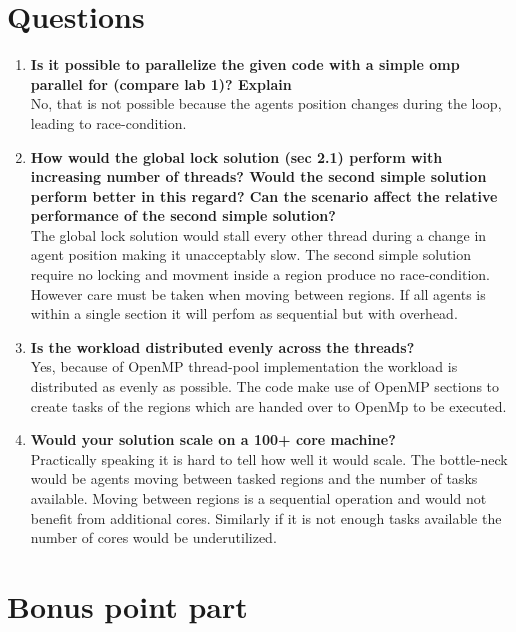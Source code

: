 \documentclass[a4paper,11pt]{article}
\begin{document}
\section{Questions}
\begin{enumerate}[label=\Alph*.]
\item \textbf{Is it possible to parallelize the given code with a
  simple omp parallel for (compare lab 1)? Explain}\\ No, that is not possible
  because the agents position changes during the loop, leading to
  race-condition.
\item \textbf{How would the global lock solution (sec 2.1) perform
  with increasing number of threads? Would the second simple solution
  perform better in this regard? Can the scenario affect the relative
  performance of the second simple solution?}\\ The global lock
  solution would stall every other thread during a change in agent
  position making it unacceptably slow. The second simple solution
  require no locking and movment inside a region produce no
  race-condition. However care must be taken when moving between
  regions. If all agents is within a single section it will perfom as
  sequential but with overhead.
\item \textbf{Is the workload distributed evenly across the
  threads?}\\ Yes, because of OpenMP thread-pool implementation the
  workload is distributed as evenly as possible. The code make use of
  OpenMP sections to create tasks of the regions which are handed over
  to OpenMp to be executed.
\item \textbf{Would your solution scale on a 100+ core
  machine?}\\ Practically speaking it is hard to tell how well it
  would scale. The bottle-neck would be agents moving between tasked
  regions and the number of tasks available. Moving between regions is
  a sequential operation and would not benefit from additional
  cores. Similarly if it is not enough tasks available the number of
  cores would be underutilized.
\end{enumerate}
\section{Bonus point part}
\begin{enumerate}[label=\Alph*.]

\end{enumerate}
\end{document}
